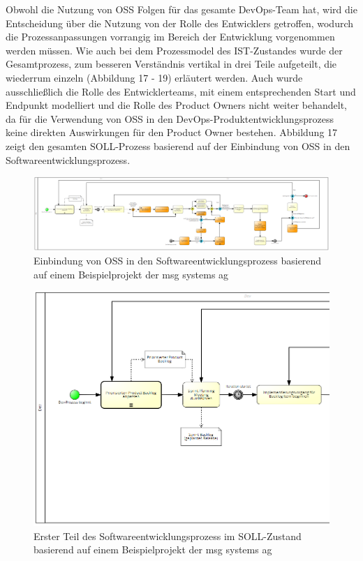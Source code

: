 Obwohl die Nutzung von OSS Folgen für das gesamte DevOps-Team hat, wird die Entscheidung über die Nutzung von der Rolle des Entwicklers getroffen, wodurch die Prozessanpassungen vorrangig im Bereich der Entwicklung vorgenommen werden müssen. Wie auch bei dem Prozessmodel des IST-Zustandes wurde der Gesamtprozess, zum besseren Verständnis vertikal in drei Teile aufgeteilt, die wiederrum einzeln (Abbildung 17 - 19) erläutert werden. Auch wurde ausschließlich die Rolle des Entwicklerteams, mit einem entsprechenden Start und Endpunkt modelliert und die Rolle des Product Owners nicht weiter behandelt, da für die Verwendung von OSS in den DevOps-Produktentwicklungsprozess keine direkten Auswirkungen für den Product Owner bestehen. Abbildung 17 zeigt den gesamten SOLL-Prozess basierend auf der Einbindung von OSS in den Softwareentwicklungsprozess.

\begin{figure}[p]
    \centering
    \includegraphics[angle=90, scale=0.8]{Bilder/SOLL-Prozess.png}
    \caption{Einbindung von OSS in den Softwareentwicklungsprozess basierend auf einem Beispielprojekt der msg systems ag}
\end{figure}

\newpage
\begin{figure}[h]
    \centering
    \includegraphics[scale=0.3]{Bilder/SOLL-Prozess_first Part.png}
    \caption{Erster Teil des Softwareentwicklungsprozess im SOLL-Zustand basierend auf einem Beispielprojekt der msg systems ag}
\end{figure}

